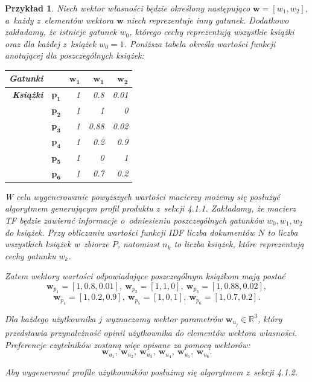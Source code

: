 \documentclass[12pt,a4paper]{report}
\newtheorem{przyklad}{Przykład}[chapter]{\normalfont}
\newcommand{\setR}{\mathbb{R}}
\newcommand{\setPrzedmioty}{\mathit{P}}
\begin{document}
\begin{przyklad}
Niech wektor własności będzie określony następująco $\mathbf{w} = [w_1, w_2]$, a~każdy z~elementów wektora $\mathbf{w}$ niech reprezentuje inny gatunek. Dodatkowo zakładamy, że istnieje gatunek $w_0$, którego cechy reprezentują wszystkie książki oraz dla każdej z~książek $w_0=1$. Poniższa tabela określa wartości funkcji anotującej dla poszczególnych książek:
\begin{center}
\begin{tabular}{|r|r|r|r|r|} \hline
\textbf{Gatunki} & & $\mathbf{w_1}$ &  $\mathbf{w_1}$ & $\mathbf{w_2}$  \\
\hline
\hline
\textbf{Książki} &$\mathbf{p_1}$ & 1 & 0.8 & 0.01 \\
\hline
&$\mathbf{p_2}$ & 1 & 1 & 0  \\
\hline
&$\mathbf{p_3}$ & 1 & 0.88 & 0.02 \\
\hline
&$\mathbf{p_4}$ & 1 & 0.2 & 0.9 \\
\hline
&$\mathbf{p_5}$ & 1 & 0 & 1 \\
\hline
&$\mathbf{p_6}$ & 1 & 0.7 & 0.2 \\
\hline
\end{tabular}
\end{center}

W celu wygenerowanie powyższych wartości macierzy możemy się posłużyć algorytmem generującym profil produktu z~sekcji 4.1.1. Zakładamy, że macierz TF będzie zawierać informacje o~odniesieniu poszczególnych gatunków $w_0, w_1,w_2$ do książek. Przy obliczaniu wartości funkcji IDF liczba dokumentów $N$ to liczba wszystkich książek w~zbiorze $\setPrzedmioty$, natomiast $n_k$ to liczba książek, które reprezentują cechy gatunku $w_k$.

Zatem wektory wartości odpowiadające poszczególnym książkom mają postać
$$
\mathbf{w}_{p_1} = [1, 0.8, 0.01], \: \mathbf{w}_{p_2} = [1, 1, 0], \: \mathbf{w}_{p_3} = [1, 0.88, 0.02],
$$
$$
\mathbf{w}_{p_4} = [1, 0.2, 0.9], \: \mathbf{w}_{p_5} = [1, 0, 1], \: \mathbf{w}_{p_6} = [1, 0.7, 0.2].
$$
\bigskip
\bigskip
\bigskip
\bigskip

Dla każdego użytkownika $j$ wyznaczamy wektor parametrów $\mathbf{w}_{u_j} \in \setR^3$, który przedstawia przynależność opinii użytkownika do elementów wektora własności. Preferencje czytelników zostaną więc opisane za pomocą wektorów:
$$
\mathbf{w}_{u_1}, \: \mathbf{w}_{u_2}, \: \mathbf{w}_{u_3}, \: \mathbf{w}_{u_4}, \: \mathbf{w}_{u_5}, \: \mathbf{w}_{u_6}.
$$
\bigskip

Aby wygenerować profile użytkowników posłużmy się algorytmem z~sekcji 4.1.2.


\end{przyklad}
\end{document}
